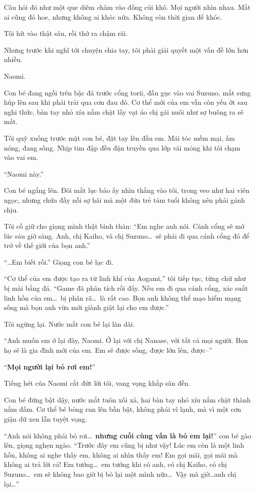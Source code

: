 \documentclass[../main.tex]{subfiles}
\begin{document}
Câu hỏi đó như một que diêm châm vào đống củi khô. Mọi người nhìn nhau. Mắt ai cũng đỏ hoe, nhưng không ai khóc nữa. Không còn thời gian để khóc.

Tôi hít vào thật sâu, rồi thở ra chậm rãi.

\ct

Nhưng trước khi nghĩ tới chuyện chia tay, tôi phải giải quyết một vấn đề lớn hơn nhiều.

Naomi.

Con bé đang ngồi trên bậc đá trước cổng torii, đầu gục vào vai Suzuno, mắt sưng húp lên sau khi phải trải qua cơn đau đó. Cơ thể mới của em vẫn còn yếu ớt sau nghi thức, bàn tay nhỏ xíu nắm chặt lấy vạt áo chị gái nuôi như sợ buông ra sẽ mất.

Tôi quỳ xuống trước mặt con bé, đặt tay lên đầu em. Mái tóc mềm mại, ấm nóng, đang sống. Nhịp tim đập đều đặn truyền qua lớp vải mỏng khi tôi chạm vào vai em.

``Naomi này.''

Con bé ngẩng lên. Đôi mắt lục bảo ấy nhìn thẳng vào tôi, trong veo như hai viên ngọc, nhưng chứa đầy nỗi sợ hãi mà một đứa trẻ tám tuổi không nên phải gánh chịu.

Tôi cố giữ cho giọng mình thật bình thản: ``Em nghe anh nói. Cánh cổng sẽ mở lúc sáu giờ sáng. Anh, chị Kaiho, và chị Suzuno\dots\ sẽ phải đi qua cánh cổng đó để trở về thế giới của bọn anh.''

``\dots Em biết rồi.'' Giọng con bé lạc đi.

``Cơ thể của em được tạo ra từ linh khí của Aogami,'' tôi tiếp tục, từng chữ như bị mài bằng đá. ``Game đã phân tích rồi đấy. Nếu em đi qua cánh cổng, xác suất linh hồn của em\dots\ bị phân rã\dots\ là rất cao. Bọn anh không thể mạo hiểm mạng sống mà bọn anh vừa mới giành giật lại cho em được.''

Tôi ngừng lại. Nước mắt con bé lại lăn dài.

``Anh muốn em ở lại đây, Naomi. Ở lại với chị Nanase, với tất cả mọi người. Bọn họ sẽ là gia đình mới của em. Em sẽ được sống, được lớn lên, được--''

``\textbf{Mọi người lại bỏ rơi em!}''

Tiếng hét của Naomi cắt đứt lời tôi, vang vọng khắp sân đền.

Con bé đứng bật dậy, nước mắt tuôn xối xả, hai bàn tay nhỏ xíu nắm chặt thành nắm đấm. Cơ thể bé bỏng run lên bần bật, không phải vì lạnh, mà vì một cơn giận dữ xen lẫn tuyệt vọng.

``Anh nói không phải bỏ rơi\dots\ \textbf{nhưng cuối cùng vẫn là bỏ em lại!}'' con bé gào lên, giọng nghẹn ngào. ``Trước đây em cũng bị như vậy! Lúc em còn là một linh hồn, không ai nghe thấy em, không ai nhìn thấy em! Em gọi mãi, gọi mãi mà không ai trả lời cả! Em tưởng\dots\ em tưởng khi có anh, có chị Kaiho, có chị Suzuno\dots\ em sẽ không bao giờ bị bỏ lại một mình nữa\dots\ Vậy mà giờ\dots anh chị lại\dots''
\end{document}
